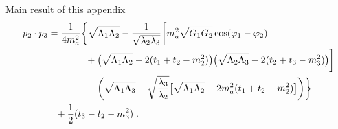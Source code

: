 \begin{bluenv}{Main result of this appendix}
    \begin{gather}
        \begin{aligned}
            p_2 \cdot p_3 &= 
            \frac{1}{4 m_a^2} 
            \bigg\{
            \sqrt{\Lambda_1 \Lambda_2}
                    - 
                    \frac{1}{\sqrt{\lambda_2 \lambda_3}}
                    \bigg[
                        m_a^2 \sqrt{G_1 G_2} \cos (\varphi_1 - \varphi_2) \\
                        &\hphantom{=\frac{1}{4 m_a^2}\bigg\{} + 
                        \big(\sqrt{\Lambda_1 \Lambda_2} - 2 (t_1 + t_2 - m_2^2)\big)
                        \big(\sqrt{\Lambda_2 \Lambda_3} - 2 (t_2 + t_3 - m_3^2)\big)
                    \bigg] \\
            &\hphantom{=\frac{1}{4 m_a^2}\bigg\{} -
            \bigg(
            \sqrt{\Lambda_1 \Lambda_3} - \sqrt{\frac{\lambda_3}{\lambda_2}} 
                    \big[
                        \sqrt{\Lambda_1 \Lambda_2} - 2 m_a^2(t_1 + t_2 - m_2^2)
                    \big]
            \bigg)
            \bigg\} \\
            &\hphantom{=}+
            \frac{1}{2}(t_3 - t_2 - m_3^2) \; .
        \end{aligned}
    \end{gather}
\end{bluenv}